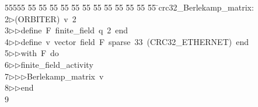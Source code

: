 %
%
\begin{tabbing}
55555 \= 55 \= 55 \= 55 \= 55 \= 55 \= 55 \= 55 \= 55 \= 55 \= 55 \= 55 \= 55 \= \>crc32\_Berlekamp\_matrix:\\[0pt]
2\>$\triangleright$\>(ORBITER)\ v\ 2\ \\[0pt]
3\>$\triangleright$\>$\triangleright$\>define\ F\ finite\_field\ q\ 2\ end\ \\[0pt]
4\>$\triangleright$\>$\triangleright$\>define\ v\ vector\ field\ F\ sparse\ 33\ (CRC32\_ETHERNET)\ end\ \\[0pt]
5\>$\triangleright$\>$\triangleright$\>with\ F\ do\ \\[0pt]
6\>$\triangleright$\>$\triangleright$\>finite\_field\_activity\ \\[0pt]
7\>$\triangleright$\>$\triangleright$\>$\triangleright$\>Berlekamp\_matrix\ v\ \\[0pt]
8\>$\triangleright$\>$\triangleright$\>end\\[0pt]
9\>\end{tabbing}

